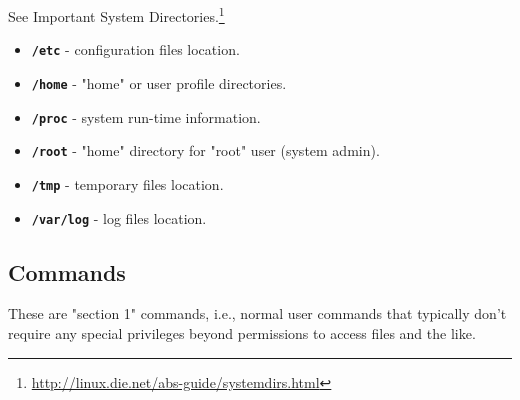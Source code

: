 \documentclass[10pt,american,]{book}
\renewcommand{\href}[2]{#2\footnote{\url{#1}}}
\numberwithin{figure}{chapter}
\begin{document}
See \href{http://linux.die.net/abs-guide/systemdirs.html}{Important
System Directories.}

\begin{itemize}
\item
  \textbf{\texttt{/etc}} - configuration files location.
\item
  \textbf{\texttt{/home}} - "home" or user profile
  directories.
\item
  \textbf{\texttt{/proc}} - system run-time information.
\item
  \textbf{\texttt{/root}} - "home" directory for "root" user
  (system admin).
\item
  \textbf{\texttt{/tmp}} - temporary files location.
\item
  \textbf{\texttt{/var/log}} - log files location.
\end{itemize}

\subsection*{Commands}\label{commands}

These are "section 1" commands, i.e., normal user commands that
typically don't require any special privileges beyond permissions to
access files and the like.
\end{document}
